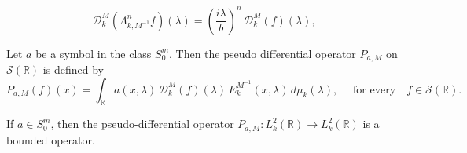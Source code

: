 \documentclass[10pt,a4paper]{amsart}
\begin{document}
\begin{equation}\label{C7-e:2.1}
\mathcal{D}_k^M \left( \Lambda_{k, M^{-1}}^nf\right)(\lambda) = \left( \frac{i\lambda}{b}\right)^n \, \mathcal{D}_k^M(f)(\lambda),
\end{equation}

\begin{definition} \label{C7-D3.2}
Let  $a$ be a symbol in the class $S_0^m$. Then the pseudo differential operator $P_{a,M}$ on $ \mathcal{S}(\mathbb{R})$ is defined by
\begin{equation*}
P_{a,M}(f)(x) =  \int_{\mathbb{R}}  a(x,\lambda)\, \mathcal{D}_k^M(f)(\lambda)\, E_k^{M^{-1}}(x,\lambda)\,d\mu_k(\lambda), \quad \text{ for every} \quad f \in \mathcal{S}(\mathbb{R}).
\end{equation*}
\end{definition}

 \begin{theorem}  If $a\in S^m_0$, then the pseudo-differential operator 
 $P_{a,M}:L^2_k(\mathbb{R}) \to L^2_k(\mathbb{R})$ is a bounded operator.
\end{theorem}
\end{document}
